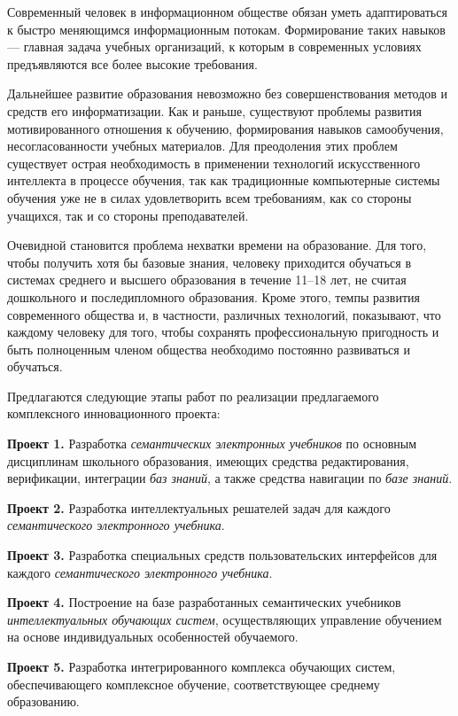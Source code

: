 Современный человек в информационном обществе обязан уметь адаптироваться к быстро меняющимся информационным потокам. Формирование таких навыков --- главная задача учебных организаций, к которым в современных условиях предъявляются все более высокие требования.

Дальнейшее развитие образования невозможно без совершенствования методов и средств его информатизации. Как и раньше, существуют проблемы развития мотивированного отношения к обучению, формирования навыков самообучения, несогласованности учебных материалов. Для преодоления этих проблем существует острая необходимость в применении технологий искусственного интеллекта в процессе обучения, так как традиционные компьютерные системы обучения уже не в силах удовлетворить всем требованиям, как со стороны учащихся, так и со стороны преподавателей.

Очевидной становится проблема нехватки времени на образование. Для того, чтобы получить хотя бы базовые знания, человеку приходится обучаться в системах среднего и высшего образования в течение 11--18 лет, не считая дошкольного и последипломного образования. Кроме этого, темпы развития современного общества и, в частности, различных технологий, показывают, что каждому человеку для того, чтобы сохранять профессиональную пригодность и быть полноценным членом общества необходимо постоянно развиваться и обучаться.

Предлагаются следующие этапы работ по реализации предлагаемого комплексного инновационного проекта:

\textbf{Проект 1.} Разработка \textit{семантических электронных учебников} по основным дисциплинам школьного образования, имеющих средства редактирования, верификации, интеграции \textit{баз знаний}, а также средства навигации по \textit{базе знаний}.

\textbf{Проект 2.} Разработка интеллектуальных решателей задач для каждого \textit{семантического электронного учебника}.

\textbf{Проект 3.} Разработка специальных средств пользовательских интерфейсов для каждого \textit{семантического электронного учебника}.

\textbf{Проект 4.} Построение на базе разработанных семантических учебников \textit{интеллектуальных обучающих систем}, осуществляющих управление обучением на основе индивидуальных особенностей обучаемого.

\textbf{Проект 5.} Разработка интегрированного комплекса обучающих систем, обеспечивающего комплексное обучение, соответствующее среднему образованию.

